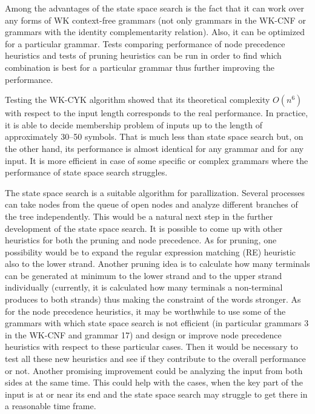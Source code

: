 Among the advantages of the state space search is the fact that it can work over any forms of WK context-free grammars (not only grammars in the WK-CNF or grammars with the identity complementarity relation). Also, it can be optimized for a particular grammar. Tests comparing performance of node precedence heuristics and tests of pruning heuristics can be run in order to find which combination is best for a particular grammar thus further improving the performance.

Testing the WK-CYK algorithm showed that its theoretical complexity $O(n^6)$ with respect to the input length corresponds to the real performance. In practice, it is able to decide membership problem of inputs up to the length of approximately 30--50 symbols. That is much less than state space search but, on the other hand, its performance is almost identical for any grammar and for any input. It is more efficient in case of some specific or complex grammars where the performance of state space search struggles.

The state space search is a suitable algorithm for parallization. Several processes can take nodes from the queue of open nodes and analyze different branches of the tree independently. This would be a natural next step in the further development of the state space search.
It is possible to come up with other heuristics for both the pruning and node precedence. As for pruning, one possibility would be to expand the regular expression matching (RE) heuristic also to the lower strand.
Another pruning idea is to calculate how many terminals can be generated at minimum to the lower strand and to the upper strand individually (currently, it is calculated how many terminals a non-terminal produces to both strands) thus making the constraint of the words stronger.
As for the node precedence heuristics, it may be worthwhile to use some of the grammars with which state space search is not efficient (in particular grammars 3 in the WK-CNF and grammar 17) and design or improve node precedence heuristics with respect to these particular cases. Then it would be necessary to test all these new heuristics and see if they contribute to the overall performance or not.
Another promising improvement could be analyzing the input from both sides at the same time. This could help with the cases, when the key part of the input is at or near its end and the state space search may struggle to get there in a reasonable time frame.

